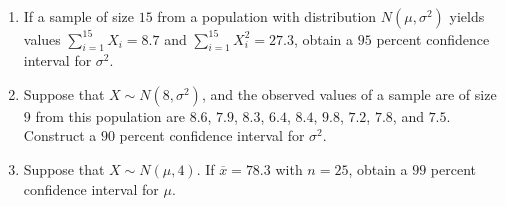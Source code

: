 \documentclass[svgnames]{amsart}
\begin{document}
\begin{enumerate}[leftmargin=*, itemsep=2mm]
\item If a sample of size $15$ from a population with distribution $N(\mu, \sigma^2)$ yields values $\sum_{i=1}^{15} X_i = 8.7$ and $\sum_{i = 1}^{15} X_i^2 = 27.3$, obtain a $95$ percent confidence interval for $\sigma^2$.

\item Suppose that $X \sim N(8, \sigma^2)$, and the observed values of a sample are of size $9$ from this population are $8.6$, $7.9$, $8.3$, $6.4$, $8.4$, $9.8$, $7.2$, $7.8$, and $7.5$. Construct a $90$ percent confidence interval for $\sigma^2$.

\item Suppose that $X \sim N(\mu, 4)$. If $\overline x = 78.3$ with $n = 25$, obtain a $99$ percent confidence interval for $\mu$.

\end{enumerate}
\end{document}
